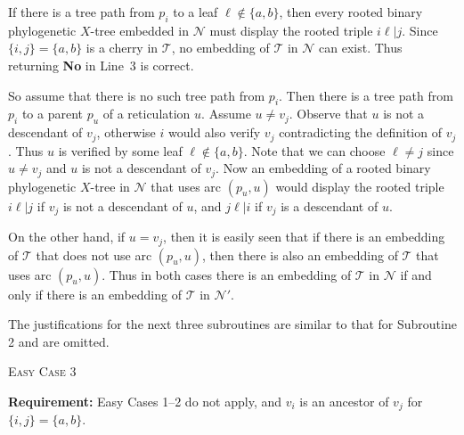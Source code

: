 \documentclass[11pt]{amsart}
\begin{document}
If there is a tree path from $p_i$ to a leaf $\ell\not\in \{a, b\}$, then every rooted binary phylogenetic $X$-tree  embedded in ${{\mathcal N}}$ must display the rooted triple $i\ell|j$. Since $\{i, j\}=\{a, b\}$ is a cherry in ${{\mathcal T}}$, no embedding of ${{\mathcal T}}$ in ${{\mathcal N}}$ can exist. Thus returning {\bf No} in Line~3 is correct.

So assume that there is no such tree path from $p_i$. Then there is a tree path from $p_i$ to a parent $p_u$ of a reticulation $u$. Assume $u\neq v_j$. Observe that $u$ is not a descendant of $v_j$, otherwise $i$ would also verify $v_j$ contradicting the definition of $v_j$. Thus $u$ is verified by some leaf $\ell\not\in \{a, b\}$. Note that we can choose $\ell\neq j$ since $u\neq v_j$ and $u$ is not a descendant of $v_j$. Now an embedding of a rooted binary phylogenetic $X$-tree in ${{\mathcal N}}$ that uses arc $(p_u, u)$ would display the rooted triple $i\ell|j$ if $v_j$ is not a descendant of $u$, and $j\ell|i$ if $v_j$ is a descendant of $u$.

On the other hand, if $u=v_j$, then it is easily seen that if there is an embedding of ${{\mathcal T}}$ that does not use arc $(p_u, u)$, then there is also an embedding of ${{\mathcal T}}$ that uses arc $(p_u, u)$. Thus in both cases there is an embedding of ${{\mathcal T}}$ in ${{\mathcal N}}$ if and only if there is an embedding of ${{\mathcal T}}$ in ${{\mathcal N}}'$.

The justifications for the next three subroutines are similar to that for Subroutine 2 and are omitted.

\begin{algorithm}[H]
 \caption{\textsc{Easy Case 3}}
\begin{algorithmic}[1]
 \Statex\textbf{Requirement:} Easy Cases 1--2 do not apply, and $v_i$ is an ancestor of $v_j$ for $\{i, j\}= \{a, b\}$.
        \EndIf
 \end{algorithmic}
\end{algorithm}
\end{document}
